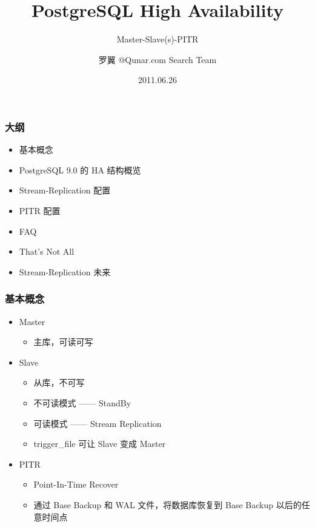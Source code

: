 \documentclass[11pt, xetex, xcolor=x11names]{beamer}
\title{PostgreSQL High Availability}
\subtitle{Master-Slave(s)-PITR}
\author{罗翼 @Qunar.com Search Team}
\date{2011.06.26}
\institute{Search Team}
\begin{document}
\plainframe{\titlepage}

\begin{frame}
  \frametitle{大纲}

  \begin{itemize}
  \item 基本概念
  \item PostgreSQL 9.0 的 HA 结构概览
  \item Stream-Replication 配置
  \item PITR 配置
  \item FAQ
  \item That's Not All
  \item Stream-Replication 未来
  \end{itemize}
\end{frame}

\begin{frame}
  \frametitle{基本概念}
  \begin{itemize}
  \item Master
  \begin{itemize}
  \item 主库，可读可写
  \end{itemize}
  \end{itemize}

  \begin{itemize}
  \item Slave
  \begin{itemize}
  \item 从库，不可写
  \item 不可读模式 —— StandBy
  \item 可读模式  ——   Stream Replication
  \item trigger\_file 可让 Slave 变成 Master
  \end{itemize}
  \end{itemize}

  \begin{itemize}
  \item PITR
  \begin{itemize}
  \item Point-In-Time Recover
  \item 通过 Base Backup 和 WAL 文件，将数据库恢复到 Base Backup 以后的任意时间点
  \end{itemize}
  \end{itemize}

\end{frame}
\end{document}
